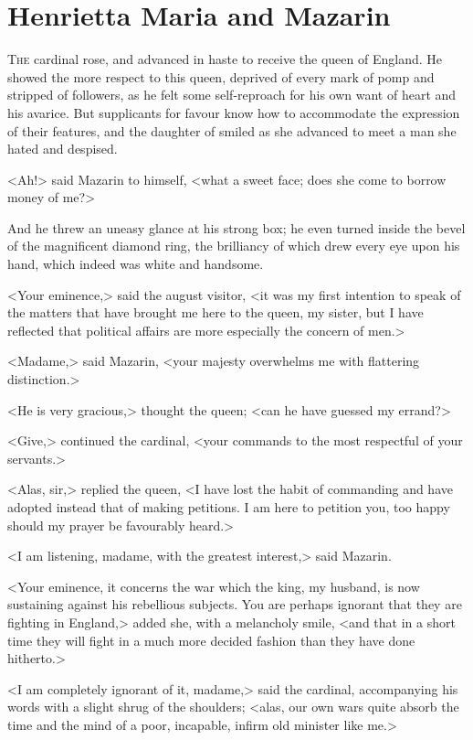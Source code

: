 \chapter{Henrietta Maria and Mazarin}

 \lettrine{T}{he} cardinal rose, and advanced in haste to receive the queen of England. He showed the more respect to this queen, deprived of every mark of pomp and stripped of followers, as he felt some self-reproach for his own want of heart and his avarice. But supplicants for favour know how to accommodate the expression of their features, and the daughter of  smiled as she advanced to meet a man she hated and despised.

<Ah!> said Mazarin to himself, <what a sweet face; does she come to borrow money of me?>

And he threw an uneasy glance at his strong box; he even turned inside the bevel of the magnificent diamond ring, the brilliancy of which drew every eye upon his hand, which indeed was white and handsome.

<Your eminence,> said the august visitor, <it was my first intention to speak of the matters that have brought me here to the queen, my sister, but I have reflected that political affairs are more especially the concern of men.>

<Madame,> said Mazarin, <your majesty overwhelms me with flattering distinction.>

<He is very gracious,> thought the queen; <can he have guessed my errand?>

<Give,> continued the cardinal, <your commands to the most respectful of your servants.>

<Alas, sir,> replied the queen, <I have lost the habit of commanding and have adopted instead that of making petitions. I am here to petition you, too happy should my prayer be favourably heard.>

<I am listening, madame, with the greatest interest,> said Mazarin.

<Your eminence, it concerns the war which the king, my husband, is now sustaining against his rebellious subjects. You are perhaps ignorant that they are fighting in England,> added she, with a melancholy smile, <and that in a short time they will fight in a much more decided fashion than they have done hitherto.>

<I am completely ignorant of it, madame,> said the cardinal, accompanying his words with a slight shrug of the shoulders; <alas, our own wars quite absorb the time and the mind of a poor, incapable, infirm old minister like me.>

